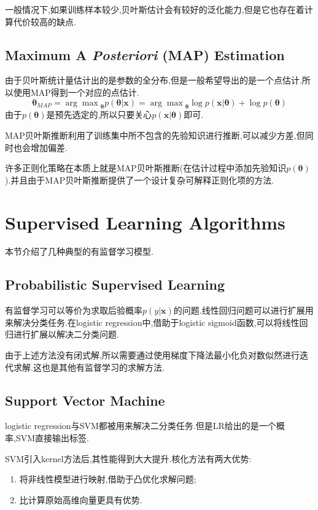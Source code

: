 一般情况下,如果训练样本较少,贝叶斯估计会有较好的泛化能力,但是它也存在着计算代价较高的缺点.

\subsection{Maximum A \textit{Posteriori} (MAP) Estimation}

由于贝叶斯统计量估计出的是参数的全分布,但是一般希望导出的是一个点估计.所以使用MAP得到一个对应的点估计.
\begin{equation}\label{eq:map_estimation}
{\bm\theta}_{MAP}={\arg\max}_{\bm\theta} p({\bm\theta}|\bm x)={\arg\max}_{\bm\theta}\log p(\bm x|{\bm\theta})+\log p({\bm\theta})
\end{equation}
由于$p({\bm\theta})$是预先选定的,所以只要关心$p(\bm x|{\bm\theta})$即可.

MAP贝叶斯推断利用了训练集中所不包含的先验知识进行推断,可以减少方差,但同时也会增加偏差.

许多正则化策略在本质上就是MAP贝叶斯推断(在估计过程中添加先验知识$p({\bm\theta})$).并且由于MAP贝叶斯推断提供了一个设计复杂可解释正则化项的方法.

\section{Supervised Learning Algorithms}

本节介绍了几种典型的有监督学习模型.

\subsection{Probabilistic Supervised Learning}

有监督学习可以等价为求取后验概率$p(y|\bm x)$的问题.线性回归问题可以进行扩展用来解决分类任务.在logistic regression中,借助于logistic sigmoid函数,可以将线性回归进行扩展以解决二分类问题.

由于上述方法没有闭式解,所以需要通过使用梯度下降法最小化负对数似然进行迭代求解.这也是其他有监督学习的求解方法.

\subsection{Support Vector Machine}

logistic regression与SVM都被用来解决二分类任务.但是LR给出的是一个概率,SVM直接输出标签.

SVM引入kernel方法后,其性能得到大大提升.核化方法有两大优势:
\begin{enumerate}
\item 将非线性模型进行映射,借助于凸优化求解问题;
\item 比计算原始高维向量更具有优势.
\end{enumerate}

